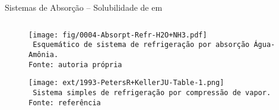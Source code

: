     \begin{frame}{Sistemas de Absorção -- Solubilidade de  em }\vspace*{-0em}
        \begin{columns}
        \end{columns}
    \end{frame}
    \begin{frame}\vspace*{-0em}
        \begin{center}
            \begin{figure}
                \fontsize{5.0}{5}\selectfont
                \texttt{[image: fig/0004-Absorpt-Refr-H2O+NH3.pdf]}
                \\\vspace*{-0.0em}\texttt{%
                    Esquemático de sistema de refrigeração por absorção Água-Amônia.\\
                    Fonte: autoria própria
                }
            \end{figure}
        \end{center}
    \end{frame}
    \begin{frame}\vspace*{-0em}
        \begin{center}
            \begin{figure}
                \fontsize{5.0}{5}\selectfont
                \texttt{[image: ext/1993-PetersR+KellerJU-Table-1.png]}
                \\\vspace*{-0.0em}\texttt{%
                    Sistema simples de refrigeração por compressão de vapor.\\
                    Fonte: referência~\cite{1993-PetersR+KellerJU-IntjThermoPhys}
                }
            \end{figure}
        \end{center}
    \end{frame}
